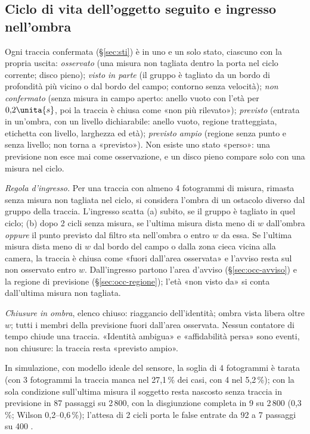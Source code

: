 \subsection{Ciclo di vita dell'oggetto seguito e ingresso nell'ombra}\label{sec:occ-ciclo}

Ogni traccia confermata (\S\ref{sec:sti}) è in uno e un solo stato, ciascuno con la propria uscita: \emph{osservato} (una misura non tagliata dentro la porta nel ciclo corrente; disco pieno); \emph{visto in parte} (il gruppo è tagliato da un bordo di profondità più vicino o dal bordo del campo; contorno senza velocità); \emph{non confermato} (senza misura in campo aperto: anello vuoto con l'età per $0{,}2\unita{s}$, poi la traccia è chiusa come «non più rilevato»); \emph{previsto} (entrata in un'ombra, con un livello dichiarabile: anello vuoto, regione tratteggiata, etichetta con livello, larghezza ed età); \emph{previsto ampio} (regione senza punto e senza livello; non torna a «previsto»). Non esiste uno stato «perso»: una previsione non esce mai come osservazione, e un disco pieno compare solo con una misura nel ciclo.

\emph{Regola d'ingresso.} Per una traccia con almeno 4 fotogrammi di misura, rimasta senza misura non tagliata nel ciclo, si considera l'ombra di un ostacolo diverso dal gruppo della traccia. L'ingresso scatta (a) subito, se il gruppo è tagliato in quel ciclo; (b) dopo 2 cicli senza misura, se l'ultima misura dista meno di $w$ dall'ombra \emph{oppure} il punto previsto dal filtro sta nell'ombra o entro $w$ da essa. Se l'ultima misura dista meno di $w$ dal bordo del campo o dalla zona cieca vicina alla camera, la traccia è chiusa come «fuori dall'area osservata» e l'avviso resta sul non osservato entro $w$. Dall'ingresso partono l'area d'avviso (\S\ref{sec:occ-avviso}) e la regione di previsione (\S\ref{sec:occ-regione}); l'età «non visto da» si conta dall'ultima misura non tagliata.

\emph{Chiusure in ombra}, elenco chiuso: riaggancio dell'identità; ombra vista libera oltre $w$; tutti i membri della previsione fuori dall'area osservata. Nessun contatore di tempo chiude una traccia. «Identità ambigua» e «affidabilità persa» sono eventi, non chiusure: la traccia resta «previsto ampio».

In simulazione, con modello ideale del sensore, la soglia di 4 fotogrammi è tarata (con 3 fotogrammi la traccia manca nel 27,1\,\% dei casi, con 4 nel 5,2\,\%); con la sola condizione sull'ultima misura il soggetto resta nascosto senza traccia in previsione in 87 passaggi su 2\,800, con la disgiunzione completa in 9 su 2\,800 (0,3\,\%; Wilson 0,2--0,6\,\%); l'attesa di 2 cicli porta le false entrate da 92 a 7 passaggi su 400 .


